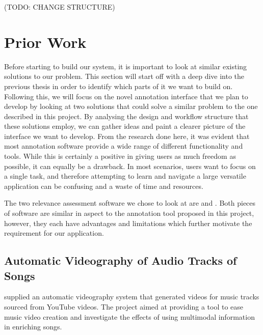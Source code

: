 \documentclass{l4proj}
\begin{document}
(TODO: CHANGE STRUCTURE)
\section{Prior Work}
Before starting to build our system, it is important to look at similar existing solutions to our problem. This section will start off with a deep dive into the previous thesis in order to identify which parts of it we want to build on. Following this, we will focus on the novel annotation interface that we plan to develop by looking at two solutions that could solve a similar problem to the one described in this project. By analysing the design and workflow structure that these solutions employ, we can gather ideas and paint a clearer picture of the interface we want to develop. From the research done here, it was evident that most annotation software provide a wide range of different functionality and tools. While this is certainly a positive in giving users as much freedom as possible, it can equally be a drawback. In most scenarios, users want to focus on a single task, and therefore attempting to learn and navigate a large versatile application can be confusing and a waste of time and resources.

The two relevance assessment software we chose to look at are \cite{labelbox} and \cite{superannotate}. Both pieces of software are similar in aspect to the annotation tool proposed in this project, however, they each have advantages and limitations which further motivate the requirement for our application.

\subsection{Automatic Videography of Audio Tracks of Songs}
\label{sec:background_parker}
\cite{parker} supplied an automatic videography system that generated videos for music tracks sourced from YouTube videos. The project aimed at providing a tool to ease music video creation and investigate the effects of using multimodal information in enriching songs.
\end{document}
